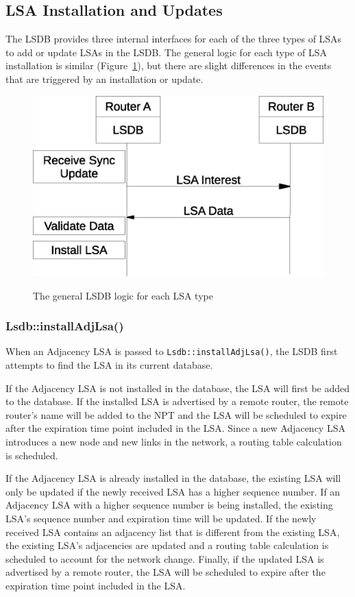 \subsection{LSA Installation and Updates}

The LSDB provides three internal interfaces for each of the three types of LSAs to add or update LSAs in the LSDB.
The general logic for each type of LSA installation is similar (Figure~\ref{fig:generic-lsdb-flow}), but there are slight differences in the events that are triggered by an installation or update.

\begin{figure}
\center
\includegraphics[width=0.5\linewidth]{figures/generic-lsdb-flow}
\label{fig:generic-lsdb-flow}
\caption{The general LSDB logic for each LSA type}
\end{figure}

\subsubsection{Lsdb::installAdjLsa()}

When an Adjacency LSA is passed to \texttt{Lsdb::installAdjLsa()}, the LSDB first attempts to find the LSA in its current database.

If the Adjacency LSA is not installed in the database, the LSA will first be added to the database.
If the installed LSA is advertised by a remote router, the remote router's name will be added to the NPT and the LSA will be scheduled to expire after the expiration time point included in the LSA.
Since a new Adjacency LSA introduces a new node and new links in the network, a routing table calculation is scheduled.

If the Adjacency LSA is already installed in the database, the existing LSA will only be updated if the newly received LSA has a higher sequence number.
If an Adjacency LSA with a higher sequence number is being installed, the existing LSA's sequence number and expiration time will be updated.
If the newly received LSA contains an adjacency list that is different from the existing LSA, the existing LSA's adjacencies are updated and a routing table calculation is scheduled to account for the network change.
Finally, if the updated LSA is advertised by a remote router, the LSA will be scheduled to expire after the expiration time point included in the LSA.

